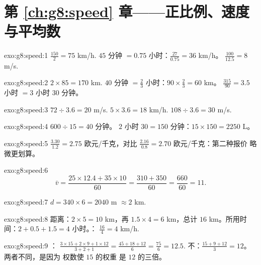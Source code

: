 \section*{第 \ref{ch:g8:speed} 章——正比例、速度与平均数}

\begin{solution}{exo:g8:speed:1}
$\frac{150}{2} = 75$ km/h. \quad
$45$ 分钟 $= 0.75$ 小时：$\frac{27}{0.75} = 36$ km/h。 \quad
$\frac{100}{12.5} = 8$ m/s.
\end{solution}

\begin{solution}{exo:g8:speed:2}
$2 \times 85 = 170$ km. \quad
$40$ 分钟 $= \frac23$ 小时：$90 \times \frac23 = 60$ km。 \quad
$\frac{315}{90} = 3.5$ 小时 $= 3$ 小时 $30$ 分钟。
\end{solution}

\begin{solution}{exo:g8:speed:3}
$72 \div 3.6 = 20$ m/s. \quad
$5 \times 3.6 = 18$ km/h. \quad
$108 \div 3.6 = 30$ m/s.
\end{solution}

\begin{solution}{exo:g8:speed:4}
$600 \div 15 = 40$ 分钟。 \quad
$2$ 小时 $30 = 150$ 分钟：$15 \times 150 = 2250$ L。
\end{solution}

\begin{solution}{exo:g8:speed:5}
$\frac{3.30}{1.2} = 2.75$ 欧元/千克，对比
$\frac{2.16}{0.8} = 2.70$ 欧元/千克：第二种报价
略微更划算。
\end{solution}

\begin{solution}{exo:g8:speed:6}
\[
\bar v = \frac{25 \times 12.4 + 35 \times 10}{60}
= \frac{310 + 350}{60} = \frac{660}{60} = 11 .
\]
\end{solution}

\begin{solution}{exo:g8:speed:7}
$d = 340 \times 6 = 2040$ m $\approx 2$ km.
\end{solution}

\begin{solution}{exo:g8:speed:8}
距离：$2 \times 5 = 10$ km，再 $1.5 \times 4 = 6$ km，总计
$16$ km。所用时间：$2 + 0.5 + 1.5 = 4$ 小时。：
$\frac{16}{4} = 4$ km/h.
\end{solution}

\begin{solution}{exo:g8:speed:9}
：
$\frac{3 \times 15 + 2 \times 9 + 1 \times 12}{3 + 2 + 1}
= \frac{45 + 18 + 12}{6} = \frac{75}{6} = 12.5$.
不：$\frac{15 + 9 + 12}{3} = 12$。两者不同，是因为
权数使 $15$ 的权重
是 $12$ 的三倍。
\end{solution}

